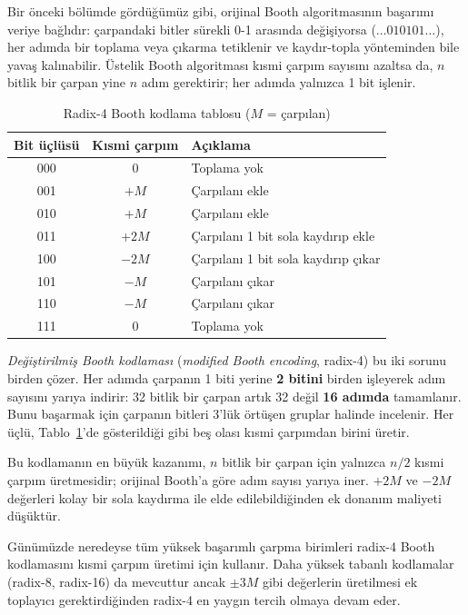 Bir önceki bölümde gördüğümüz gibi, orijinal Booth algoritmasının başarımı veriye bağlıdır: çarpandaki bitler sürekli 0-1 arasında değişiyorsa ($\ldots 010101 \ldots$), her adımda bir toplama veya çıkarma tetiklenir ve kaydır-topla yönteminden bile yavaş kalınabilir. Üstelik Booth algoritması kısmi çarpım sayısını azaltsa da, $n$ bitlik bir çarpan yine $n$ adım gerektirir; her adımda yalnızca 1 bit işlenir.

\begin{table}[htbp]
\centering
\caption{Radix-4 Booth kodlama tablosu ($M$ = çarpılan)}
\label{tab:radix4-booth}
\begin{tabular}{c c l}
\toprule
\textbf{Bit üçlüsü} & \textbf{Kısmi çarpım} & \textbf{Açıklama} \\
\midrule
000 & $0$ & Toplama yok \\
001 & $+M$ & Çarpılanı ekle \\
010 & $+M$ & Çarpılanı ekle \\
011 & $+2M$ & Çarpılanı 1 bit sola kaydırıp ekle \\
100 & $-2M$ & Çarpılanı 1 bit sola kaydırıp çıkar \\
101 & $-M$ & Çarpılanı çıkar \\
110 & $-M$ & Çarpılanı çıkar \\
111 & $0$ & Toplama yok \\
\bottomrule
\end{tabular}
\end{table}

\emph{Değiştirilmiş Booth kodlaması} (\emph{modified Booth encoding}, radix-4) bu iki sorunu birden çözer. Her adımda çarpanın 1 biti yerine \textbf{2 bitini} birden işleyerek adım sayısını yarıya indirir: 32 bitlik bir çarpan artık 32 değil \textbf{16 adımda} tamamlanır. Bunu başarmak için çarpanın bitleri 3'lük örtüşen gruplar halinde incelenir. Her üçlü, Tablo~\ref{tab:radix4-booth}'de gösterildiği gibi beş olası kısmi çarpımdan birini üretir.

Bu kodlamanın en büyük kazanımı, $n$ bitlik bir çarpan için yalnızca $n/2$ kısmi çarpım üretmesidir; orijinal Booth'a göre adım sayısı yarıya iner. $+2M$ ve $-2M$ değerleri kolay bir sola kaydırma ile elde edilebildiğinden ek donanım maliyeti düşüktür.

Günümüzde neredeyse tüm yüksek başarımlı çarpma birimleri radix-4 Booth kodlamasını kısmi çarpım üretimi için kullanır. Daha yüksek tabanlı kodlamalar (radix-8, radix-16) da mevcuttur ancak $\pm 3M$ gibi değerlerin üretilmesi ek toplayıcı gerektirdiğinden radix-4 en yaygın tercih olmaya devam eder.

